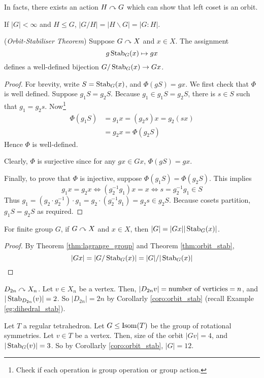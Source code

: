 \documentclass[10pt, a4paper, twoside]{report}
\begin{document}
In facts, there exists an action \(H\curvearrowright G\) which can show that left coset is an orbit.
\begin{lemma}
    If \(|G|<\infty\) and \(H\leq G\), \(|G/H|=|H\backslash G|=|G:H|\).
\end{lemma}
\begin{theorem}
    (\emph{Orbit-Stabiliser Theorem}) Suppose \(G\curvearrowright X\) and \(x\in X\). The assignment \[g\operatorname{Stab}_G(x)\mapsto gx\] defines a well-defined bijection \(G/\operatorname{Stab}_G(x)\to Gx\).
    \label{thm:orbit_stab}
\end{theorem}
\begin{proof}
    For brevity, write \(S=\operatorname{Stab}_G(x)\), and \(\Phi(gS)=gx\). We first check that \(\Phi\) is well defined. Suppose \(g_1S=g_2S\). Because \(g_1\in g_1S=g_2S\), there is \(s\in S\) such that \(g_1=g_2s\). Now\footnote{Check if each operation is group operation or group action.}
    \begin{align*}
        \Phi(g_1S)&=g_1x=(g_2s)x=g_2(sx) \\
        &=g_2x=\Phi(g_2S)
    \end{align*}
    Hence \(\Phi\) is well-defined.

    Clearly, \(\Phi\) is surjective since for any \(gx\in Gx\), \(\Phi(gS)=gx\).

    Finally, to prove that \(\Phi\) is injective, suppose \(\Phi(g_1S)=\Phi(g_2S)\). This implies 
    \[g_1x=g_2x\Leftrightarrow (g_2^{-1}g_1)x=x\Leftrightarrow s=g_2^{-1}g_1\in S\]
    Thus \(g_1=(g_2\cdot g_2^{-1})\cdot g_1=g_2\cdot(g_2^{-1}g_1)=g_2s\in g_2S\).
    Because cosets partition, \(g_1S=g_2S\) as required.
\end{proof}
\begin{corollary}
    For finite group \(G\), if \(G\curvearrowright X\) and \(x\in X\), then \(|G|=|Gx||\operatorname{Stab}_G(x)|\).
    \label{coro:orbit_stab}
\end{corollary}
\begin{proof}
    By Theorem \ref{thm:lagrange_group} and Theorem \ref{thm:orbit_stab}, 
    \[|Gx|=|G/\operatorname{Stab}_G(x)|=|G|/|\operatorname{Stab}_G(x)|\]
\end{proof}
\begin{example}
    \(D_{2n}\curvearrowright X_n\). Let \(v\in X_n\) be a vertex. Then, \(|D_{2n}v|=\text{number of verticies}\\=n\), and \(|\operatorname{Stab}_{D_{2n}}(v)|=2\). So \(|D_{2n}|=2n\) by Corollarly \ref{coro:orbit_stab} (recall Example \ref{eg:dihedral_stab}).
\end{example}
\begin{example}
    Let \(T\) a regular tetrahedron. Let \(G\leq\operatorname{Isom}(T)\) be the group of rotational symmetries. Let \(v\in T\) be a vertex. Then, size of the orbit \(|Gv|=4\), and \(|\operatorname{Stab}_G(v)|=3\). So by Corollarly \ref{coro:orbit_stab}, \(|G|=12\). 
\end{example}
\end{document}
